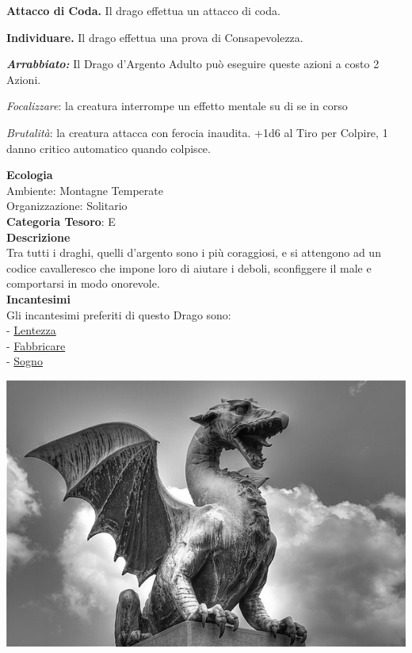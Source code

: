 \begin{multicols}{2}
{\textbf{Attacco di Coda.} Il drago effettua un attacco di coda.

\textbf{Individuare.} Il drago effettua una prova di Consapevolezza.

\emph{\textbf{Arrabbiato:}} Il Drago d'Argento Adulto può eseguire queste azioni a costo 2 Azioni.

\emph{Focalizzare}: la creatura interrompe un effetto mentale su di se in corso

\emph{Brutalità}: la creatura attacca con ferocia inaudita. +1d6 al Tiro per Colpire, 1 danno critico automatico quando colpisce.

\textbf{Ecologia}\\
Ambiente: Montagne Temperate\\
Organizzazione: Solitario\\
\textbf{Categoria Tesoro}: E\\
\textbf{Descrizione}\\
Tra tutti i draghi, quelli d'argento sono i più coraggiosi, e si attengono ad un codice cavalleresco che impone loro di aiutare i deboli, sconfiggere il male e comportarsi in modo onorevole.\\
\textbf{Incantesimi}\\
Gli incantesimi preferiti di questo Drago sono:\\
- \hyperlink{lentezza}{Lentezza}\\
- \hyperlink{Fabbricare}{Fabbricare}\\
- \hyperlink{Sogno}{Sogno}

\medskip

\begin{center}
	\includegraphics[width=0.9\linewidth]{immagini/Dragon_Ljubljana.png}


\end{center}}
\end{multicols}
